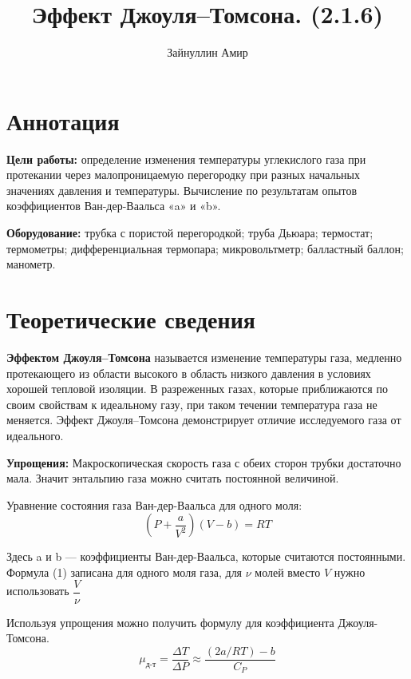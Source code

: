 \documentclass[a4paper,12pt]{article}
\begin{document}
\title{\textbf{Эффект Джоуля–Томсона. (2.1.6)}}
\author{Зайнуллин Амир}

\maketitle

\section{Аннотация}
    \textbf{Цели работы:} определение изменения температуры углекислого газа при протекании через малопроницаемую перегородку при разных начальных значениях давления и температуры.
    Вычисление по результатам опытов коэффициентов Ван-дер-Ваальса «a» и «b». \par
    \textbf{Оборудование:} трубка с пористой перегородкой; труба Дьюара; термостат; термометры; дифференциальная термопара; микровольтметр; балластный баллон; манометр.

\section{Теоретические сведения}

    \textbf{Эффектом Джоуля–Томсона} называется изменение температуры газа, медленно протекающего из области высокого в область низкого давления в условиях хорошей тепловой изоляции. 
    В разреженных газах, которые приближаются по своим свойствам к идеальному газу, при таком течении температура газа не меняется. Эффект Джоуля–Томсона демонстрирует отличие исследуемого газа от идеального. \par
    \textbf{Упрощения:} Макроскопическая скорость газа с обеих сторон трубки достаточно мала. Значит энтальпию газа можно считать постоянной величиной. \par 
    \medskip
    Уравнение состояния газа Ван-дер-Ваальса для одного моля:
    \begin{equation}
        (P + \dfrac{a}{V^2})(V - b) = RT
    \end{equation}

    Здесь a и b — коэффициенты Ван-дер-Ваальса, которые считаются постоянными. Формула (1) записана для одного моля газа, для $\nu$ молей вместо $V$ нужно использовать $\dfrac{V}{\nu}$
    
    \bigskip
    
    Используя упрощения можно получить формулу для коэффициента Джоуля-Томсона.
    \begin{equation}
    \mu_\text{д-т} = \frac{\Delta T}{\Delta P} \approx \frac{(2a/RT) - b}{C_P}
    \end{equation}
\end{document}
